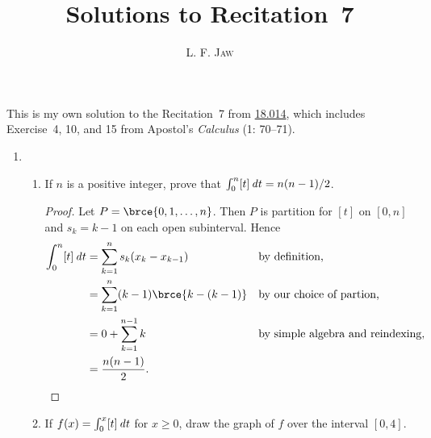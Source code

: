 \documentclass[a4paper]{article}
\title{Solutions to Recitation~7}
\author{L. F. \textsc{Jaw}}
\begin{document}
\maketitle

This is my own solution to the Recitation~7 from
\href{https://ocw.mit.edu/courses/mathematics/18-014-calculus-with-theory-fall-2010/recitations/}{18.014},
which includes Exercise~4, 10, and 15 from Apostol's
\textit{Calculus} (1: 70--71).

\begin{enumerate}
\item
  \begin{enumerate}
  \item If \(n\) is a positive integer, prove that \(\int_0^n [t] \mathop{}\!\mathit{d} t = n(n-1)/2\).

    \begin{proof}
      Let \(P = \brce{0, 1, \dotsc, n}\).  Then \(P\) is partition for
      \([t]\) on \([0, n]\) and \(s_k = k-1\) on each open subinterval.  Hence
      \begin{align*}
        \int_0^n [t] \dt
          &= \sum_{k=1}^n s_k (x_k - x_{k-1})  && \reason{by definition,} \\
          &= \sum_{k=1}^n (k-1)\brce{k - (k-1)} && \reason{by our choice of partion,} \\
          &= 0 + \sum_{k=1}^{n-1} k && \reason{by simple algebra and reindexing,} \\
          &= \frac{n(n-1)}{2}. && \qedhere
      \end{align*}
    \end{proof}

  \item If \(f(x) = \int_0^x [t] \mathop{}\!\mathit{d} t\) for \(x \ge 0\), draw the graph of
    \(f\) over the interval \([0, 4]\).


\end{enumerate}
\end{enumerate}
\end{document}
